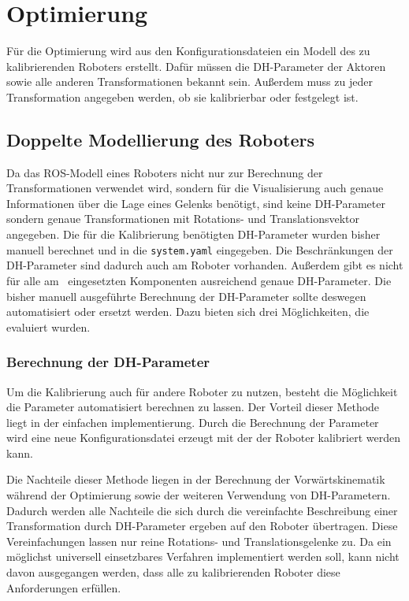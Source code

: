 

\section{Optimierung} %

\label{sec:Optimierung}

Für die Optimierung wird aus den Konfigurationsdateien ein Modell des zu 
kalibrierenden Roboters erstellt. Dafür müssen die \ac{DH-Parameter} der Aktoren
sowie alle anderen Transformationen bekannt sein. Außerdem muss zu jeder Transformation 
angegeben werden, ob sie kalibrierbar oder festgelegt ist.

\subsection{Doppelte Modellierung des Roboters} %
\label{sub:doppelte modellierung}


Da das \ac{ROS}-Modell eines 
Roboters nicht nur zur Berechnung der Transformationen verwendet wird, sondern für die Visualisierung auch genaue
Informationen über die Lage eines Gelenks benötigt, sind keine \ac{DH-Parameter} sondern
genaue Transformationen mit Rotations- und Translationsvektor angegeben. Die für die
Kalibrierung benötigten \ac{DH-Parameter} wurden bisher manuell berechnet und
in die \texttt{system.yaml} eingegeben. Die Beschränkungen der \ac{DH-Parameter}
sind dadurch auch am Roboter vorhanden. Außerdem gibt es nicht für alle am \cob\ 
eingesetzten Komponenten ausreichend genaue \ac{DH-Parameter}. Die bisher manuell
ausgeführte Berechnung der \ac{DH-Parameter} sollte deswegen automatisiert oder
ersetzt werden. Dazu bieten sich drei Möglichkeiten, die evaluiert wurden. 




\subsubsection{Berechnung der \ac{DH-Parameter}} %

\label{ssub:Berechnung der dh-par}

Um die Kalibrierung auch für andere Roboter zu nutzen,
besteht die Möglichkeit die Parameter automatisiert berechnen zu lassen. Der Vorteil
dieser Methode liegt in der einfachen implementierung. Durch die Berechnung der Parameter 
wird eine neue Konfigurationsdatei erzeugt mit der der Roboter kalibriert werden kann.

Die Nachteile dieser Methode liegen in der Berechnung der Vorwärtskinematik während der
Optimierung sowie der weiteren Verwendung von \ac{DH-Parameter}n. Dadurch 
werden alle Nachteile die sich durch die vereinfachte Beschreibung einer 
Transformation durch \ac{DH-Parameter} ergeben auf den Roboter übertragen.
Diese Vereinfachungen lassen nur reine Rotations- und Translationsgelenke zu.
Da ein möglichst universell einsetzbares Verfahren implementiert werden soll, 
kann nicht davon ausgegangen werden, dass alle zu kalibrierenden Roboter diese 
Anforderungen erfüllen. 

